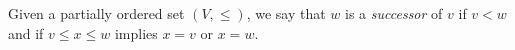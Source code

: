 Given a partially ordered set $(V, \leq)$, we say that $w$ is a \textit{successor} of $v$ if $v < w$ and if $v \leq x \leq w$ implies $x = v$ or $x = w$.
